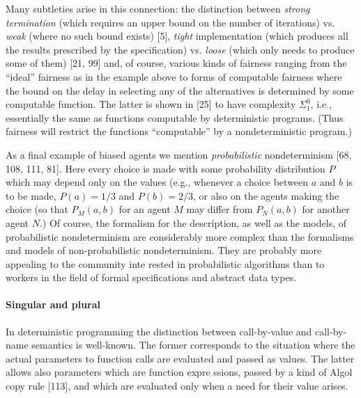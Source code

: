 \documentclass[10pt]{article}
\begin{document}
Many subtleties arise in this connection: the 
distinction between {\em strong termination} 
(which requires an upper bound on the number of 
iterations) vs. {\em weak} (where no such bound exists) [5], {\em tight}
implementation (which produces all the results prescribed by the 
specification) vs. {\em loose} (which only needs to produce some of them) 
[21, 99] and, of course, various kinds of fairness ranging from the 
``ideal'' 
 fairness as in the example above to forms of computable fairness 
where the bound on the delay in selecting any of the alternatives is 
determined by some computable function. The latter is shown in [25] 
to have complexity $\Sigma_{1}^{0}$, i.e., essentially the same as 
functions computable by deterministic 
programs. (Thus fairness will restrict the functions ``computable''  
by a nondeterministic program.)\par 
As a final example of biased agents we mention {\em probabilistic} 
nondeterminism [68, 108, 111, 81]. Here every choice is made with 
some probability distribution $P$ which may depend only on the 
values (e.g., whenever a choice between $a$ and $b$
is to be made, $P(a)=1/3$ and $P(b)=2/3$, 
or also on the agents making the choice (so that 
$P_{M}(a,b)$ for an agent $M$ may differ from $P_{N}(a,b)$ for another 
agent $N$.) Of course, the formalism for the description, as well as the 
models, of probabilistic nondeterminism are considerably more complex 
than the formalisms and models of non-probabilistic nondeterminism. 
They are probably more appealing to the community inte
rested in probabilistic algorithms than to workers in the field of 
formal specifications and abstract data types.   

\paragraph*{Singular and plural} 
In deterministic programming the 
distinction between call-by-value and call-by-name semantics is 
well-known. The former corresponds to the situation where the actual 
parameters to function calls are evaluated and passed as values. The 
latter allows also parameters which are function expre
ssions, passed by a kind of Algol copy rule [113], and which are 
evaluated only when a need for their value arises.
\end{document}

